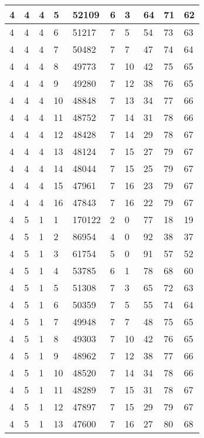 \begin{table}[!ht]
\begin{tabular}{|l|l|l|l|l|l|l|l|l|l|}
        4 & 4 & 4 & 5 & 52109 & 6 & 3 & 64 & 71 & 62 \\ \hline
        4 & 4 & 4 & 6 & 51217 & 7 & 5 & 54 & 73 & 63 \\ \hline
        4 & 4 & 4 & 7 & 50482 & 7 & 7 & 47 & 74 & 64 \\ \hline
        4 & 4 & 4 & 8 & 49773 & 7 & 10 & 42 & 75 & 65 \\ \hline
        4 & 4 & 4 & 9 & 49280 & 7 & 12 & 38 & 76 & 65 \\ \hline
        4 & 4 & 4 & 10 & 48848 & 7 & 13 & 34 & 77 & 66 \\ \hline
        4 & 4 & 4 & 11 & 48752 & 7 & 14 & 31 & 78 & 66 \\ \hline
        4 & 4 & 4 & 12 & 48428 & 7 & 14 & 29 & 78 & 67 \\ \hline
        4 & 4 & 4 & 13 & 48124 & 7 & 15 & 27 & 79 & 67 \\ \hline
        4 & 4 & 4 & 14 & 48044 & 7 & 15 & 25 & 79 & 67 \\ \hline
        4 & 4 & 4 & 15 & 47961 & 7 & 16 & 23 & 79 & 67 \\ \hline
        4 & 4 & 4 & 16 & 47843 & 7 & 16 & 22 & 79 & 67 \\ \hline
        4 & 5 & 1 & 1 & 170122 & 2 & 0 & 77 & 18 & 19 \\ \hline
        4 & 5 & 1 & 2 & 86954 & 4 & 0 & 92 & 38 & 37 \\ \hline
        4 & 5 & 1 & 3 & 61754 & 5 & 0 & 91 & 57 & 52 \\ \hline
        4 & 5 & 1 & 4 & 53785 & 6 & 1 & 78 & 68 & 60 \\ \hline
        4 & 5 & 1 & 5 & 51308 & 7 & 3 & 65 & 72 & 63 \\ \hline
        4 & 5 & 1 & 6 & 50359 & 7 & 5 & 55 & 74 & 64 \\ \hline
        4 & 5 & 1 & 7 & 49948 & 7 & 7 & 48 & 75 & 65 \\ \hline
        4 & 5 & 1 & 8 & 49303 & 7 & 10 & 42 & 76 & 65 \\ \hline
        4 & 5 & 1 & 9 & 48962 & 7 & 12 & 38 & 77 & 66 \\ \hline
        4 & 5 & 1 & 10 & 48520 & 7 & 14 & 34 & 78 & 66 \\ \hline
        4 & 5 & 1 & 11 & 48289 & 7 & 15 & 31 & 78 & 67 \\ \hline
        4 & 5 & 1 & 12 & 47897 & 7 & 15 & 29 & 79 & 67 \\ \hline
        4 & 5 & 1 & 13 & 47600 & 7 & 16 & 27 & 80 & 68 \\ \hline

\end{tabular}
\end{table}
